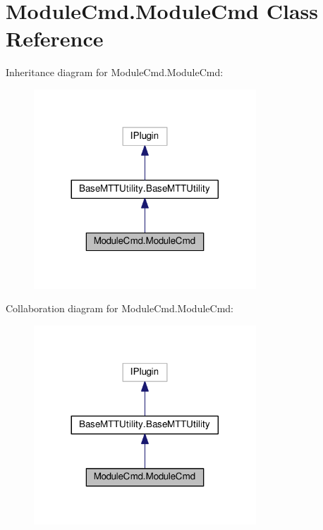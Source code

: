 \hypertarget{classModuleCmd_1_1ModuleCmd}{\section{Module\-Cmd.\-Module\-Cmd Class Reference}
\label{classModuleCmd_1_1ModuleCmd}
}


Inheritance diagram for Module\-Cmd.\-Module\-Cmd\-:
\nopagebreak
\begin{figure}[H]
\begin{center}
\leavevmode
\includegraphics[width=236pt]{classModuleCmd_1_1ModuleCmd__inherit__graph}
\end{center}
\end{figure}


Collaboration diagram for Module\-Cmd.\-Module\-Cmd\-:
\nopagebreak
\begin{figure}[H]
\begin{center}
\leavevmode
\includegraphics[width=236pt]{classModuleCmd_1_1ModuleCmd__coll__graph}
\end{center}
\end{figure}
